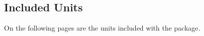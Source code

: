 \documentclass{article}
\begin{document}
\clearpage
\subsection{Included Units} %

\label{units:included}
On the following pages are the units included with the package.


\clearpage
{}


\printindex  %
\end{document}
